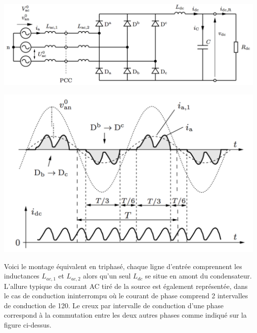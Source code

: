 		\begin{center}
		\begin{minipage}{0.45\textwidth}
			\begin{flushleft}
			\includegraphics[scale=0.4]{ch2/18}
			\end{flushleft}
		\end{minipage}			
		\begin{minipage}{0.45\textwidth}
			\begin{flushright}
			\includegraphics[scale=0.4]{ch2/19}
			\end{flushright}
		\end{minipage}			
		\end{center}
		
		Voici le montage équivalent en triphasé, chaque ligne d'entrée comprennent les inductances $L_{ac,1}$ et $L_{ac,2}$ alors qu'un seul $L_{dc}$ se situe en amont du condensateur. L'allure typique du courant AC tiré de la source est également représentée, dans le cas de conduction ininterrompu où le courant de phase comprend 2 intervalles de conduction de 120\degres . Le creux par intervalle de conduction d'une phase correspond à la commutation entre les deux autres phases comme indiqué sur la figure ci-dessus.\\
		
